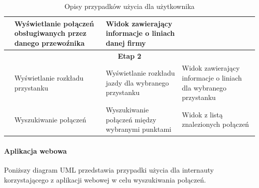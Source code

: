 \documentclass[10pt,a4paper]{article}
\begin{document}
\begin{table}[H]
\begin{tabularx}{\textwidth}{|c|X|X|X|}
		& Wyświetlanie połączeń obsługiwanych przez danego przewoźnika
		& Widok zawierający informacje o liniach danej firmy \\
		\hline
		\multicolumn{4}{|c|}{\textbf{Etap 2}} \\
		\hline
		\multirow{5}{*}{\rotatebox[origin=c]{90}{Pracownik}}
		& Wyświetlanie rozkładu przystanku
		& Wyświetlanie rozkładu jazdy dla wybranego przystanku
		& Widok zawierający informacje o liniach dla wybranego przystanku \\
		\cline{2-4}
		& Wyszukiwanie połączeń
		& Wyszukiwanie połączeń między wybranymi punktami
		& Widok z listą znalezionych połączeń \\
		\hline
	\end{tabularx}
	\caption{Opisy przypadków użycia dla użytkownika}
\end{table}

\newpage
\paragraph{Aplikacja webowa}
Poniższy diagram UML przedstawia przypadki użycia dla internauty korzystającego z aplikacji webowej w celu wyszukiwania połączeń.
\end{document}
